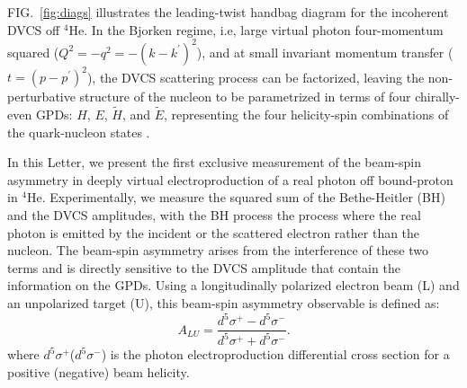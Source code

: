 \documentclass[twocolumn,nofootinbib,showpacs,prl,superscriptaddress,secnumarabic,amssymb,nobibnotes,aps,floatfix]{revtex4}
\begin{document}
FIG.~\ref{fig:diags} illustrates the 
leading-twist handbag diagram for the incoherent DVCS off $^{4}$He. In the 
Bjorken regime, i.e, large virtual photon four-momentum squared 
($Q^{2}=-q^2=-(k-k^\prime)^2$), and at small invariant momentum transfer ($t=(p-p^\prime)^2$), the 
DVCS scattering process can be factorized, leaving the non-perturbative structure 
of the nucleon to be parametrized in terms of four chirally-even GPDs: $H$, 
$E$, $\widetilde{H}$, and $\widetilde{E}$, representing the four helicity-spin 
combinations of the quark-nucleon states \cite{Freund_Collins,Ji_Osborne}.

In this Letter, we present the first exclusive measurement of the beam-spin asymmetry 
in deeply virtual electroproduction of a real photon off bound-proton in $^{4}$He. 
Experimentally, we measure the squared sum of the Bethe-Heitler (BH) and the DVCS 
amplitudes, with the BH process the process where the real photon is emitted by 
the incident or the scattered electron rather than the nucleon. The beam-spin 
asymmetry arises from the interference of these two terms and is directly 
sensitive to the DVCS amplitude that contain the information on the GPDs. 
Using a longitudinally polarized electron beam (L) and an unpolarized target 
(U), this beam-spin asymmetry observable is defined as:
\begin{equation}
  A_{LU} = \frac{d^{5}\sigma^{+} - d^{5}\sigma^{-} }
                {d^{5}\sigma^{+} + d^{5}\sigma^{-}}.
    \label{BSA_equation}
  \end{equation}
where $d^{5}\sigma^{+}$($d^{5}\sigma^{-}$) is the photon electroproduction 
differential cross section for a positive (negative) beam helicity. 
\end{document}
